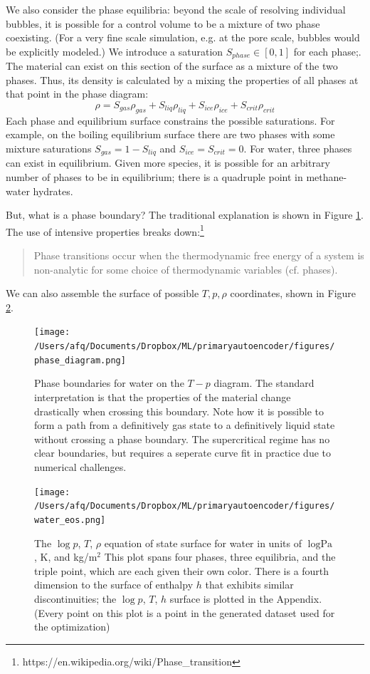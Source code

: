 \documentclass[]{article}
\begin{document}
We also consider the phase equilibria: beyond the scale of resolving
individual bubbles, it is possible
for a control volume to be a mixture of two phase coexisting.
(For a very fine scale simulation, e.g. at the pore scale, bubbles
would be explicitly modeled.)
We introduce a saturation $S_{phase}\in[0,1]$ for each phase;.
The material can exist on this section of the surface as a mixture of
the two phases. Thus, its density is calculated by a mixing the
properties of all phases at that point in the phase diagram:
\begin{equation}
  \rho = S_{gas} \rho_{gas} + S_{liq} \rho_{liq} + S_{ice}
    \rho_{ice} + S_{crit} \rho_{crit}
  \end{equation}
Each phase
and equilibrium surface constrains the possible saturations. For example, on the boiling equilibrium surface there are two phases with some mixture
saturations \(S_{gas}=1-S_{liq}\) and $S_{ice}=S_{crit}=0$. 
For water, three phases can exist in equilibrium. Given more species, it is possible for an arbitrary number of phases
to be in equilibrium; there is a quadruple point in methane-water
hydrates.

But, what is a phase boundary? The traditional explanation is shown in
Figure \ref{fig:phaseboundaries}. The use of intensive properties breaks down:\footnote{https://en.wikipedia.org/wiki/Phase\_transition}

\begin{quote}
Phase transitions occur when the thermodynamic free energy of a system
is non-analytic for some choice of thermodynamic variables (cf. phases).
\end{quote}

We can also assemble the surface of possible $T,p,\rho$ coordinates,
shown in Figure \ref{fig:pTrho}.
\begin{figure}
\centering
\texttt{[image: /Users/afq/Documents/Dropbox/ML/primaryautoencoder/figures/phase\_diagram.png]}
\caption{\label{fig:phaseboundaries}Phase boundaries for water on the $T-p$ diagram. The standard
interpretation is that the properties of the material change
drastically when crossing this boundary. Note how it is possible to form a path from a
definitively gas state to a definitively liquid state without crossing
a phase boundary. The supercritical regime has no clear boundaries,
but requires a seperate curve fit in practice due to numerical challenges.}
\end{figure}

\begin{figure}
\centering
\texttt{[image: /Users/afq/Documents/Dropbox/ML/primaryautoencoder/figures/water\_eos.png]}
\caption{\label{fig:pTrho} The $\log{p}$, $T$, $\rho$ equation of
  state surface for water in units of $\log{\text{Pa}}$, K, and \si{}{kg/m$^2$} This plot spans four phases, three
  equilibria, and the triple point, which are each given their own color.
  There is a fourth dimension to the surface of enthalpy $h$ that exhibits
  similar discontinuities; the $\log{p}$, $T$, $h$ surface is plotted
  in the Appendix. (Every point on this plot is a point in the
  generated dataset used for the optimization)}
\end{figure}
\end{document}
